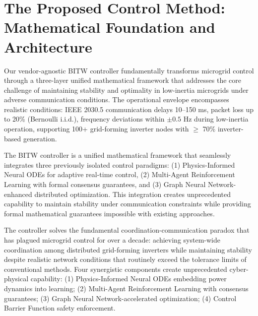 \documentclass[12pt]{article}
\begin{document}
\section{The Proposed Control Method: Mathematical Foundation and Architecture}
\vspace{-0.5cm}
Our vendor-agnostic BITW controller fundamentally transforms microgrid control through a three-layer unified mathematical framework that addresses the core challenge of maintaining stability and optimality in low-inertia microgrids under adverse communication conditions. The operational envelope encompasses realistic conditions: IEEE 2030.5 communication delays 10--150 ms, packet loss up to 20\% (Bernoulli i.i.d.), frequency deviations within $\pm 0.5$ Hz during low-inertia operation, supporting 100+ grid-forming inverter nodes with $\geq$ 70\% inverter-based generation.

The BITW controller is a unified mathematical framework that seamlessly integrates three previously isolated control paradigms: (1) Physics-Informed Neural ODEs for adaptive real-time control, (2) Multi-Agent Reinforcement Learning with formal consensus guarantees, and (3) Graph Neural Network-enhanced distributed optimization. This integration creates unprecedented capability to maintain stability under communication constraints while providing formal mathematical guarantees impossible with existing approaches.

The controller solves the fundamental coordination-communication paradox that has plagued microgrid control for over a decade: achieving system-wide coordination among distributed grid-forming inverters while maintaining stability despite realistic network conditions that routinely exceed the tolerance limits of conventional methods. Four synergistic components create unprecedented cyber-physical capability: (1) Physics-Informed Neural ODEs embedding power dynamics into learning; (2) Multi-Agent Reinforcement Learning with consensus guarantees; (3) Graph Neural Network-accelerated optimization; (4) Control Barrier Function safety enforcement.
\end{document}
